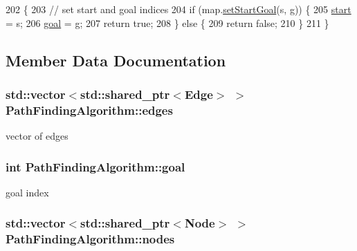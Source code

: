\begin{DoxyCode}
202                                                 \{
203     \textcolor{comment}{// set start and goal indices}
204     \textcolor{keywordflow}{if} (map.\hyperlink{classMap_aa64162f950a1936e1eaf42609e091524}{setStartGoal}(s, g)) \{
205         \hyperlink{classPathFindingAlgorithm_a1c31bd6b8c57459c32ada19cf9bf412a}{start} = s;
206         \hyperlink{classPathFindingAlgorithm_ae8acf41f92ba72a969a44640c99fb8a4}{goal} = g;
207         \textcolor{keywordflow}{return} \textcolor{keyword}{true};
208     \} \textcolor{keywordflow}{else} \{
209         \textcolor{keywordflow}{return} \textcolor{keyword}{false};
210     \}
211 \}
\end{DoxyCode}


\subsection{Member Data Documentation}
\hypertarget{classPathFindingAlgorithm_aa32be1db79cc1f557231ec2a583514bd}{
\subsubsection[{edges}]{\setlength{\rightskip}{0pt plus 5cm}std\-::vector$<$std\-::shared\-\_\-ptr$<${\bf Edge}$>$ $>$ Path\-Finding\-Algorithm\-::edges\hspace{0.3cm}{\ttfamily [protected]}}}\label{classPathFindingAlgorithm_aa32be1db79cc1f557231ec2a583514bd}


vector of edges 

\hypertarget{classPathFindingAlgorithm_ae8acf41f92ba72a969a44640c99fb8a4}{
\subsubsection[{goal}]{\setlength{\rightskip}{0pt plus 5cm}int Path\-Finding\-Algorithm\-::goal\hspace{0.3cm}{\ttfamily [protected]}}}\label{classPathFindingAlgorithm_ae8acf41f92ba72a969a44640c99fb8a4}


goal index 

\hypertarget{classPathFindingAlgorithm_a131201eeaf50772259161b509007e0aa}{
\subsubsection[{nodes}]{\setlength{\rightskip}{0pt plus 5cm}std\-::vector$<$std\-::shared\-\_\-ptr$<${\bf Node}$>$ $>$ Path\-Finding\-Algorithm\-::nodes\hspace{0.3cm}{\ttfamily [protected]}}}\label{classPathFindingAlgorithm_a131201eeaf50772259161b509007e0aa}


